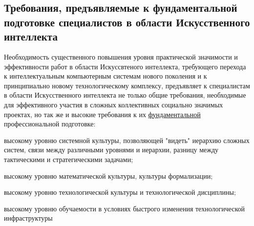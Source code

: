 \subsection*{Требования, предъявляемые к фундаментальной подготовке специалистов в области Искусственного интеллекта}
Необходимость существенного повышения уровня практической значимости и эффективности работ в области Искуссвтеного интеллекта, требующего перехода к интеллектуальным компьютерным системам нового поколения и к принципиально новому технологическому комплексу, предъявляет к специалистам в области Искусственного интеллекта не только общие требования, необходимые для эффективного участия в сложных коллективных социально значимых проектах, но так же и высокие требования к их \uline{фундаментальной} профессиональной подготовке:
\begin{textitemize}
	\item высокому уровню системной культуры, позволяющей "видеть"{} иерархию сложных систем, связи между различными уровнями и иерархии, разницу между тактическими и стратегическими задачами;
	\item высокому уровню математической культуры, культуры формализации;
	\item высокому уровню технологической культуры и технологической дисциплины;
	\item высокому уровню обучаемости в условиях быстрого изменения технологической инфраструктуры
\end{textitemize}

